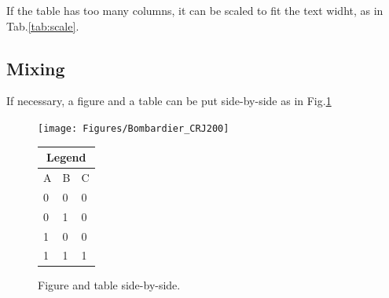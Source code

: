 If the table has too many columns, it can be scaled to fit the text widht, as in Tab.\ref{tab:scale}.
\begin{table}[!htb]
  \renewcommand{\arraystretch}{1.2} %
  \centering
  \caption{Very wide table.}
  \label{tab:scale}%
\end{table}


\subsection{Mixing}
\label{section:mixing}

If necessary, a figure and a table can be put side-by-side as in Fig.\ref{fig:side_by_side}

\begin{figure}[!htb]
  \begin{minipage}[b]{0.60\linewidth}
    \centering
    \texttt{[image: Figures/Bombardier\_CRJ200]}
  \end{minipage}%
  \begin{minipage}[b]{0.30\linewidth}
    \centering
    \begin{tabular}[b]{lll}
      \toprule
        \multicolumn{3}{c}{Legend} \\
      \midrule
        A & B & C \\
        0 & 0 & 0 \\
        0 & 1 & 0 \\
        1 & 0 & 0 \\
        1 & 1 & 1 \\
      \bottomrule
    \end{tabular}
    \vspace{5em}
  \end{minipage}
\caption{Figure and table side-by-side.}
\label{fig:side_by_side}
\end{figure}

